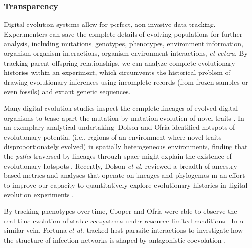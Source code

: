 \subsubsection{Transparency}


Digital evolution systems allow for perfect, non-invasive data tracking.
Experimenters can save the complete details of evolving populations for further analysis, including mutations, genotypes, phenotypes, environment information, organism-organism interactions, organism-environment interactions, \textit{et cetera}.
By tracking parent-offspring relationships, we can analyze complete evolutionary histories within an experiment, which circumvents the historical problem of drawing evolutionary inferences using incomplete records (from frozen samples or even fossils) and extant genetic sequences.

Many digital evolution studies inspect the complete lineages of evolved digital organisms to tease apart the mutation-by-mutation evolution of novel traits \citep{lenski_evolutionary_2003,dolson_spatial_2017,grabowski_case_2013,goldsby_evolutionary_2014,pontes_evolutionary_2019}.
In an exemplary analytical undertaking, Dolson and Ofria identified hotspots of evolutionary potential (i.e., regions of an environment where novel traits disproportionately evolved) in spatially heterogeneous environments, finding that the \textit{paths} traversed by lineages through space might explain the existence of evolutionary hotspots \citep{dolson_hotspots_2017}. 
Recently, Dolson \textit{et al.} reviewed a breadth of ancestry-based metrics and analyses that operate on lineages and phylogenies in an effort to improve our capacity to quantitatively explore evolutionary histories in digital evolution experiments \citep{dolson_interpreting_2020}.

By tracking phenotypes over time, Cooper and Ofria were able to observe the real-time evolution of stable ecosystems under resource-limited conditions \citep{cooper_evolution_2002}.
In a similar vein, Fortuna \textit{et al.} tracked host-parasite interactions to investigate how the structure of infection networks is shaped by antagonistic coevolution \citep{fortuna_coevolutionary_2019}.

